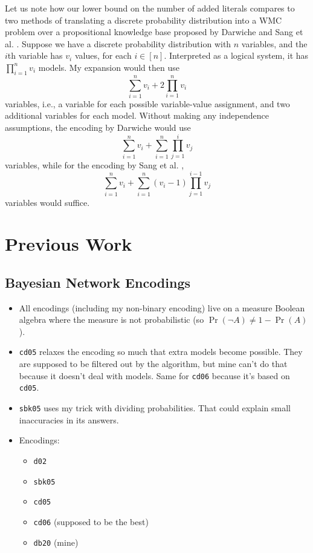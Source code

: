 \documentclass{article}
\theoremstyle{definition}
\theoremstyle{remark}
\begin{document}

Let us note how our lower bound on the number of added literals compares to two
methods of translating a discrete probability distribution into a WMC problem
over a propositional knowledge base proposed by Darwiche
\cite{DBLP:conf/kr/Darwiche02} and Sang et al. \cite{DBLP:conf/aaai/SangBK05}.
Suppose we have a discrete probability distribution with  $n$ variables, and the
$i$th variable has $v_i$ values, for each $i \in [n]$. Interpreted as a logical
system, it has $\prod_{i=1}^n v_i$ models. My expansion would then use
\[
  \sum_{i=1}^n v_i + 2\prod_{i=1}^n v_i
\]
variables, i.e., a variable for each possible variable-value assignment, and two
additional variables for each model. Without making any independence
assumptions, the encoding by Darwiche \cite{DBLP:conf/kr/Darwiche02} would use
\[
  \sum_{i=1}^n v_i + \sum_{i=1}^n \prod_{j=1}^i v_j
\]
variables, while for the encoding by Sang et al. \cite{DBLP:conf/aaai/SangBK05},
\[
  \sum_{i=1}^n v_i + \sum_{i=1}^n (v_i - 1) \prod_{j=1}^{i-1} v_j
\]
variables would suffice.

\section{Previous Work}

\subsection{Bayesian Network Encodings}

\begin{itemize}
\item All encodings (including my non-binary encoding) live on a measure Boolean
  algebra where the measure is not probabilistic (so $\Pr(\neg A) \ne 1 -
  \Pr(A)$).
\item \texttt{cd05} relaxes the encoding so much that extra models become
  possible. They are supposed to be filtered out by the algorithm, but mine
  can't do that because it doesn't deal with models. Same for \texttt{cd06}
  because it's based on \texttt{cd05}.
\item \texttt{sbk05} uses my trick with dividing probabilities. That could
  explain small inaccuracies in its answers.
\item Encodings:
  \begin{itemize}
  \item \texttt{d02} \cite{DBLP:conf/kr/Darwiche02}
  \item \texttt{sbk05} \cite{DBLP:conf/aaai/SangBK05}
  \item \texttt{cd05} \cite{DBLP:conf/ijcai/ChaviraD05}
  \item \texttt{cd06} \cite{DBLP:conf/sat/ChaviraD06} (supposed to be the best)
  \item \texttt{db20} (mine)
  \end{itemize}
\end{itemize}
\end{document}
